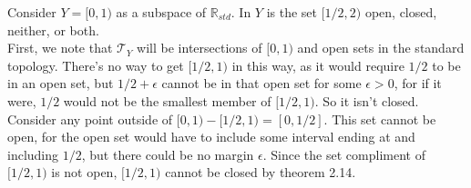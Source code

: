 \documentclass{article}
\newcommand{\R}{\mathbb{R}}
\newcommand{\topT}{\mathcal{T}}
\begin{document}
 Consider $Y = [0,1)$ as a subspace of $\R_{std}$. In $Y$ is the set $[1/2,2)$ open, closed, neither, or both.\\

 First, we note that $\topT_Y$ will be intersections of $[0,1)$ and open sets in the standard topology. There's no way to get $[1/2,1)$ in this way, as it would require $1/2$ to be in an open set, but $1/2 + \epsilon$ cannot be in that open set for some $\epsilon> 0$, for if it were, $1/2$ would not be the smallest member of $[1/2, 1)$. So it isn't closed.\\

Consider any point outside of $[0,1) - [1/2,1) = [0,1/2]$. This set cannot be open, for the open set would have to include some interval ending at and including $1/2$, but there could be no margin $\epsilon$. Since the set compliment of $[1/2,1)$ is not open, $[1/2,1)$ cannot be closed by theorem 2.14.
\end{document}
